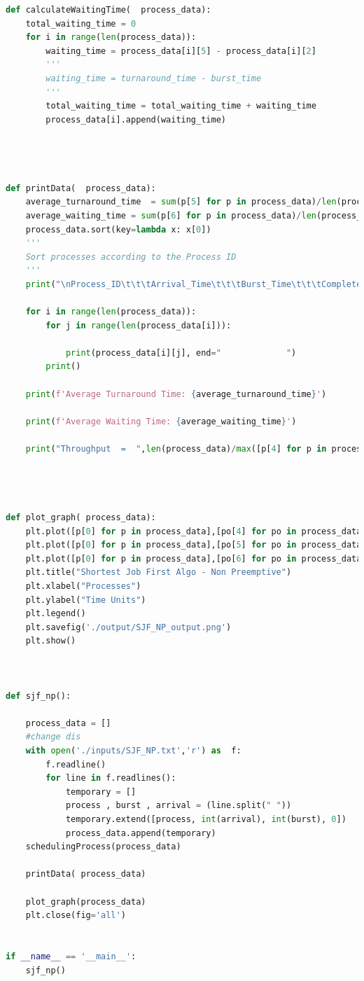 \documentclass[11pt,a4paper]{report}
\begin{document}
\begin{lstlisting}[language=Python,caption=SJF Preemptive Source code,breaklines=true,postbreak=\mbox{\textcolor{red}{$\hookrightarrow$}\space},]
def calculateWaitingTime(  process_data):
	total_waiting_time = 0
	for i in range(len(process_data)):
		waiting_time = process_data[i][5] - process_data[i][2]
		'''
		waiting_time = turnaround_time - burst_time
		'''
		total_waiting_time = total_waiting_time + waiting_time
		process_data[i].append(waiting_time)
	



def printData(  process_data):
	average_turnaround_time  = sum(p[5] for p in process_data)/len(process_data)
	average_waiting_time = sum(p[6] for p in process_data)/len(process_data)
	process_data.sort(key=lambda x: x[0])
	'''
	Sort processes according to the Process ID
	'''
	print("\nProcess_ID\t\t\tArrival_Time\t\t\tBurst_Time\t\t\tCompleted\t\t\tCompletion_Time\t\t\tTurnaround_Time\t\t\tWaiting_Time")

	for i in range(len(process_data)):
		for j in range(len(process_data[i])):

			print(process_data[i][j], end="				")
		print()

	print(f'Average Turnaround Time: {average_turnaround_time}')

	print(f'Average Waiting Time: {average_waiting_time}')

	print("Throughput  =  ",len(process_data)/max([p[4] for p in process_data]))




def plot_graph( process_data):
	plt.plot([p[0] for p in process_data],[po[4] for po in process_data],label = 'Completion Time')
	plt.plot([p[0] for p in process_data],[po[5] for po in process_data],label = 'Turnaround Time')
	plt.plot([p[0] for p in process_data],[po[6] for po in process_data],label = 'Waiting TIme')
	plt.title("Shortest Job First Algo - Non Preemptive")
	plt.xlabel("Processes")
	plt.ylabel("Time Units")
	plt.legend()
	plt.savefig('./output/SJF_NP_output.png')
	plt.show()



def sjf_np():
	
	process_data = []
	#change dis
	with open('./inputs/SJF_NP.txt','r') as  f:
		f.readline()
		for line in f.readlines():
			temporary = []
			process , burst , arrival = (line.split(" "))
			temporary.extend([process, int(arrival), int(burst), 0])
			process_data.append(temporary)
	schedulingProcess(process_data)

	printData( process_data)

	plot_graph(process_data)
	plt.close(fig='all')


if __name__ == '__main__':
	sjf_np()

\end{lstlisting}
\end{document}
